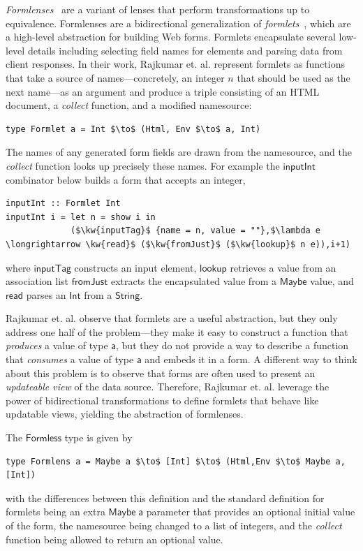 \documentclass[acmsmall,review,anonymous]{acmart}
\newcommand{\codefont}[1]{\ensuremath{\mathsf{#1}}}
\newcommand{\kw}[1]{\textcolor{dkblue}{\ensuremath{\mathsf{#1}}}}
\begin{document}
{\em Formlenses}~\cite{rajkumar2014lenses} are a variant of lenses that
perform transformations up to equivalence. Formlenses are a bidirectional
generalization of {\em formlets}~\cite{cooper2008essence}, which are a
high-level abstraction for building Web forms. Formlets encapsulate several
low-level details including selecting field names for elements and parsing data
from client responses. In their work, Rajkumar et. al. represent formlets as
functions that take a source of names---concretely, an integer $n$ that should
be used as the next name---as an argument and produce a triple consisting of an
HTML document, a {\em collect} function, and a modified namesource:
\begin{center}
\begin{lstlisting}
type Formlet a = Int $\to$ (Html, Env $\to$ a, Int)
\end{lstlisting}
\end{center}
The names of any generated form fields are drawn from the namesource, and the
{\em collect} function looks up precisely these names. For example the
\kw{inputInt} combinator below builds a form that accepts an integer,
\begin{center}
\begin{lstlisting}
inputInt :: Formlet Int
inputInt i = let n = show i in
             ($\kw{inputTag}$ {name = n, value = ""},$\lambda e \longrightarrow \kw{read}$ ($\kw{fromJust}$ ($\kw{lookup}$ n e)),i+1)
\end{lstlisting}
\end{center}
where \kw{inputTag} constructs an input element, \kw{lookup}
retrieves a value from an association list \kw{fromJust} extracts the
encapsulated value from a \kw{Maybe} value, and \kw{read} parses an \kw{Int}
from a \kw{String}.

Rajkumar et. al. observe that formlets are a useful abstraction, but they only
address one half of the problem---they make it easy to construct a function
that {\em produces} a value of type \codefont{a}, but they do not provide a way
to describe a function that {\em consumes} a value of type \codefont{a} and
embeds it in a form. A different way to think about this problem is to observe
that forms are often used to present an {\em updateable view} of the data
source. Therefore, Rajkumar et. al. leverage the power of bidirectional
transformations to define formlets that behave like updatable views, yielding
the abstraction of formlenses.

The \kw{Formless} type is given by
\begin{center}
\begin{lstlisting}
type Formlens a = Maybe a $\to$ [Int] $\to$ (Html,Env $\to$ Maybe a,[Int])
\end{lstlisting}
\end{center}
with the differences between this definition and the standard definition for
formlets being an extra \codefont{Maybe\; a} parameter that provides an
optional initial value of the form, the namesource being changed to a list of
integers, and the {\em collect} function being allowed to return an optional
value.
\end{document}
